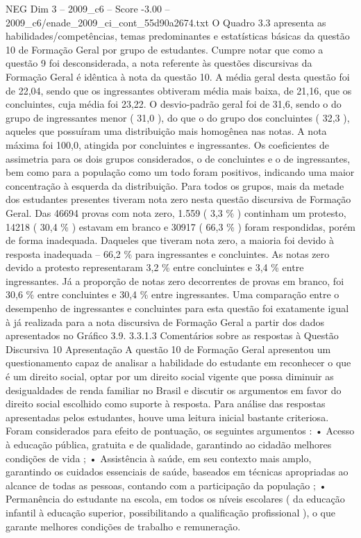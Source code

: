 \begin{textsample}{NEG Dim 3 – 2009\_c6 – Score -3.00 – 2009\_c6/enade\_2009\_ci\_cont\_55d90a2674.txt}
O Quadro 3.3 apresenta as habilidades/competências, temas predominantes e estatísticas básicas da questão 10 de Formação Geral por grupo de estudantes.
Cumpre notar que como a questão 9 foi desconsiderada, a nota referente às questões discursivas da Formação Geral é idêntica à nota da questão 10.
A média geral desta questão foi de 22,04, sendo que os ingressantes obtiveram média mais baixa, de 21,16, que os concluintes, cuja média foi 23,22.
O desvio-padrão geral foi de 31,6, sendo o do grupo de ingressantes menor ( 31,0 ), do que o do grupo dos concluintes ( 32,3 ), aqueles que possuíram uma distribuição mais homogênea nas notas.
A nota máxima foi 100,0, atingida por concluintes e ingressantes.
Os coeficientes de assimetria para os dois grupos considerados, o de concluintes e o de ingressantes, bem como para a população como um todo foram positivos, indicando uma maior concentração à esquerda da distribuição.
Para todos os grupos, mais da metade dos estudantes presentes tiveram nota zero nesta questão discursiva de Formação Geral.
Das 46694 provas com nota zero, 1.559 ( 3,3 \% ) continham um protesto, 14218 ( 30,4 \% ) estavam em branco e 30917 ( 66,3 \% ) foram respondidas, porém de forma inadequada.
Daqueles que tiveram nota zero, a maioria foi devido à resposta inadequada – 66,2 \% para ingressantes e concluintes.
As notas zero devido a protesto representaram 3,2 \% entre concluintes e 3,4 \% entre ingressantes.
Já a proporção de notas zero decorrentes de provas em branco, foi 30,6 \% entre concluintes e 30,4 \% entre ingressantes.
Uma comparação entre o desempenho de ingressantes e concluintes para esta questão foi exatamente igual à já realizada para a nota discursiva de Formação Geral a partir dos dados apresentados no Gráfico 3.9. 3.3.1.3 Comentários sobre as respostas à Questão Discursiva 10 Apresentação A questão 10 de Formação Geral apresentou um questionamento capaz de analisar a habilidade do estudante em reconhecer o que é um direito social, optar por um direito social vigente que possa diminuir as desigualdades de renda familiar no Brasil e discutir os argumentos em favor do direito social escolhido como suporte à resposta.
Para análise das respostas apresentadas pelos estudantes, houve uma leitura inicial bastante criteriosa.
Foram considerados para efeito de pontuação, os seguintes argumentos : • Acesso à educação pública, gratuita e de qualidade, garantindo ao cidadão melhores condições de vida ; • Assistência à saúde, em seu contexto mais amplo, garantindo os cuidados essenciais de saúde, baseados em técnicas apropriadas ao alcance de todas as pessoas, contando com a participação da população ; • Permanência do estudante na escola, em todos os níveis escolares ( da educação infantil à educação superior, possibilitando a qualificação profissional ), o que garante melhores condições de trabalho e remuneração.

\end{textsample}
